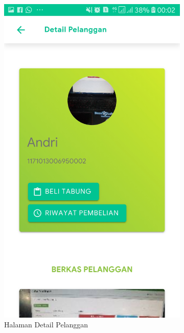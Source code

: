 \begin{figure}[H]
\begin{subfigure}[b]{0.43\linewidth}
			\includegraphics [width = \linewidth]{gambar/android/detail-pelanggan}
			\caption{Halaman Detail Pelanggan}
		\end{subfigure}
		\begin{subfigure}[b]{0.43\linewidth}

\end{subfigure}
\end{figure}
